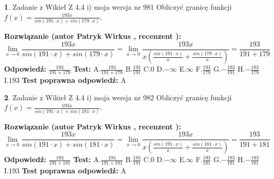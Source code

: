 \documentclass[12pt, a4paper]{article}
\theoremstyle{definition} %
\newtheorem{zad}{}
\newcommand{\zadStart}[1]{\begin{zad}#1\newline}
\newcommand{\zadStop}{\end{zad}}
\newcommand{\rozwStart}[2]{\noindent \textbf{Rozwiązanie (autor #1 , recenzent #2): }\newline}
\newcommand{\rozwStop}{\newline}
\newcommand{\odpStart}{\noindent \textbf{Odpowiedź:}\newline}
\newcommand{\odpStop}{\newline}
\newcommand{\testStart}{\noindent \textbf{Test:}\newline}
\newcommand{\testStop}{\newline}
\newcommand{\kluczStart}{\noindent \textbf{Test poprawna odpowiedź:}\newline}
\newcommand{\kluczStop}{\newline}
\begin{document}
\zadStart{Zadanie z Wikieł Z 4.4 i) moja wersja nr 981}
Obliczyć granicę funkcji $f(x)=\frac{193x}{sin(191\cdot x) +sin(179\cdot x)}$.
\zadStop
\rozwStart{Patryk Wirkus}{}
$$\lim\limits_{x\to 0}\frac{193x}{sin(191\cdot x) +sin(179\cdot x)}=\lim\limits_{x\to 0}\frac{193x}{x(\frac{sin(191\cdot x)}{x}+\frac{sin(179\cdot x)}{x})}=\frac{193}{191+179}$$
\rozwStop
\odpStart
$\frac{193}{191+179}$
\odpStop
\testStart
A.$\frac{193}{191+179}$
B.$\frac{193}{191}$
C.$0$
D.$-\infty$
E.$\infty$
F.$\frac{193}{179}$
G.$-\frac{193}{191}$
H.$-\frac{193}{179}$
I.$193$
\testStop
\kluczStart
A
\kluczStop



\zadStart{Zadanie z Wikieł Z 4.4 i) moja wersja nr 982}
Obliczyć granicę funkcji $f(x)=\frac{193x}{sin(191\cdot x) +sin(181\cdot x)}$.
\zadStop
\rozwStart{Patryk Wirkus}{}
$$\lim\limits_{x\to 0}\frac{193x}{sin(191\cdot x) +sin(181\cdot x)}=\lim\limits_{x\to 0}\frac{193x}{x(\frac{sin(191\cdot x)}{x}+\frac{sin(181\cdot x)}{x})}=\frac{193}{191+181}$$
\rozwStop
\odpStart
$\frac{193}{191+181}$
\odpStop
\testStart
A.$\frac{193}{191+181}$
B.$\frac{193}{191}$
C.$0$
D.$-\infty$
E.$\infty$
F.$\frac{193}{181}$
G.$-\frac{193}{191}$
H.$-\frac{193}{181}$
I.$193$
\testStop
\kluczStart
A
\kluczStop
\end{document}
